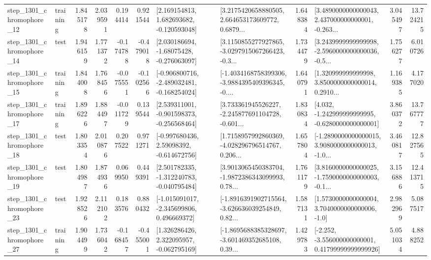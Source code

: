 \begin{tabular}{llrrrrllrlrr}
 step\_1301\_chromophore\_12 &  training &      1.845178 &    2.039591 &      0.194414 &  0.921544 &    [2.169154813, 1.682693682, -0.120593048] &  [3.2175420658880505, 2.664653173609772, 0.6879... &       1.648384 &  [3.4890000000000043, 2.437000000000001, -0.263... &            3.045497 &         13.724215 \\
 step\_1301\_chromophore\_14 &      test &      1.946159 &    1.771372 &     -0.174788 & -0.479018 &    [2.030186694, -1.68075428, -0.276063097] &  [3.1150855277927865, -3.0297915067266423, -0.3... &       1.734479 &  [3.2439999999999998, -2.5960000000000036, -0.5... &            1.756277 &          6.010726 \\
 step\_1301\_chromophore\_15 &  training &      1.844008 &    1.768456 &     -0.075551 & -0.102566 &  [-0.906800716, -2.489032481, -0.168254024] &  [-1.4034168758399306, -3.9884395409396345, -0.... &       1.640791 &  [1.320999999999998, 3.8500000000000014, 0.2910... &            1.169385 &          4.177020 \\
 step\_1301\_chromophore\_17 &  training &      1.896226 &    1.884497 &     -0.011729 &  0.139544 &   [2.539311001, -0.901598373, -0.256568464] &  [3.733361945526227, -2.245877691104728, -0.601... &       1.830834 &   [4.032, -1.242999999999995, -0.6280000000000001] &            3.860372 &         13.767777 \\
 step\_1301\_chromophore\_18 &      test &      1.803354 &    2.010876 &      0.207522 &  0.971271 &    [-0.997680436, 2.59098392, -0.614672756] &  [1.7158957992860369, -4.028296796514767, 0.206... &       1.657804 &  [-1.2890000000000015, 3.9080000000000013, -1.0... &            3.460817 &         12.827565 \\
 step\_1301\_chromophore\_19 &      test &      1.804987 &    1.874936 &      0.069950 &  0.449391 &   [2.501782335, -1.312240783, -0.040795484] &  [3.9013065450383704, -1.9872386343099993, 0.78... &       1.761179 &  [3.8160000000000025, -1.7590000000000003, -0.1... &            3.156886 &         12.413715 \\
 step\_1301\_chromophore\_23 &      test &      1.928526 &    2.112102 &      0.183576 &  0.880432 &   [-1.015091017, -2.345699806, 0.496669372] &  [-1.8916391902715564, -3.626636039254849, 0.82... &       1.587131 &     [1.5730000000000004, 3.7040000000000006, -1.0] &            2.982969 &          5.087517 \\
 step\_1301\_chromophore\_27 &  training &      1.904499 &    1.736042 &     -0.168457 & -0.455001 &    [1.326286426, 2.322095957, -0.062795169] &  [-1.8695688385328697, -3.601469352685108, 0.39... &       1.429783 &  [-2.252, -3.556000000000001, 0.41799999999999926] &            5.051034 &          4.888252 \\

\end{tabular}
